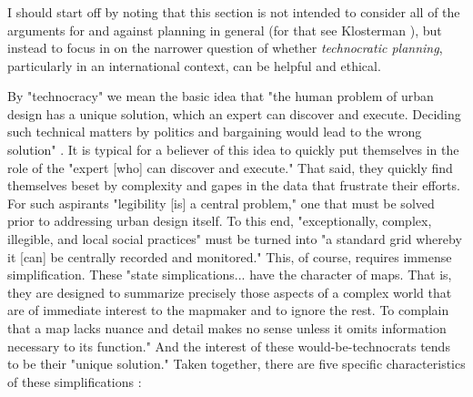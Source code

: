 


\subsubsection{} \label{sec:technocracy}

I should start off by noting that this section is not intended to consider all of the arguments for and against planning in general (for that see Klosterman \cite{klostermanArgumentsPlanning1985}), but instead to focus in on the narrower question of whether \textit{technocratic planning}, particularly in an international context, can be helpful and ethical. 

By "technocracy" we mean the basic idea that "the human problem of urban design has a unique solution, which an expert can discover and execute. Deciding such technical matters by politics and bargaining would lead to the wrong solution" \cite{scottSeeingStateHow2020}. It is typical for a believer of this idea to quickly put themselves in the role of the "expert [who] can discover and execute." That said, they quickly find themselves beset by complexity and gapes in the data that frustrate their efforts. For such aspirants "legibility [is] a central problem," one that must be solved prior to addressing urban design itself. To this end, "exceptionally, complex, illegible, and local social practices" must be turned into "a standard grid whereby it [can] be centrally recorded and monitored." This, of course, requires immense simplification. These "state simplications... have the character of maps. That is, they are designed to summarize precisely those aspects of a complex world that are of immediate interest to the mapmaker and to ignore the rest. To complain that a map lacks nuance and detail makes no sense unless it omits information necessary to its function." And the interest of these would-be-technocrats tends to be their "unique solution." Taken together, there are five specific characteristics of these simplifications \cite{scottSeeingStateHow2020}:

